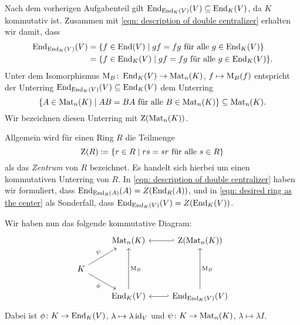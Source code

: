 \documentclass[a4paper, 10pt, numbers=noenddot]{scrartcl}
\begin{document}
Nach dem vorherigen Aufgabenteil gilt $\operatorname{End}_{\operatorname{End}_K(V)}(V) \subseteq \operatorname{End}_K(V)$, da $K$ kommutativ ist.
Zusammen mit \eqref{eqn: description of double centralizer} erhalten wir damit, dass
\begin{equation}
  \label{eqn: desired ring as the center}
  \begin{aligned}
        \operatorname{End}_{\operatorname{End}_K(V)}(V)
    &=  \{
          f \in \operatorname{End}(V)
        \mid
          \text{$gf = fg$ für alle $g \in \operatorname{End}_K(V)$}
        \}
    \\
    &=  \{
          f \in \operatorname{End}_K(V)
        \mid
          \text{$gf = fg$ für alle $g \in \operatorname{End}_K(V)$}
        \}.
  \end{aligned}
\end{equation}
Unter dem Isomorphismus $\operatorname{M}_B \colon \operatorname{End}_K(V) \to \operatorname{Mat}_n(K)$, $f \mapsto \operatorname{M}_B(f)$ entspricht der Unterring $\operatorname{End}_{\operatorname{End}_K(V)}(V) \subseteq \operatorname{End}_K(V)$ dem Unterring
\[
            \{
              A \in \operatorname{Mat}_n(K)
            \mid
              \text{$AB = BA$ für alle $B \in \operatorname{Mat}_n(K)$}
            \}
  \subseteq \operatorname{Mat}_n(K).
\]
Wir bezeichnen diesen Unterring mit $\operatorname{Z}(\operatorname{Mat}_n(K))$.

\begin{remark}
  Allgemein wird für einen Ring $R$ die Teilmenge
  \[
              \operatorname{Z}(R)
    \coloneqq \{ r \in R \mid \text{$rs = sr$ für alle $s \in R$} \}
  \]
  als das \emph{Zentrum} von $R$ bezeichnet.
  Es handelt sich hierbei um einen kommutativen Unterring von $R$.
  In \eqref{eqn: description of double centralizer} haben wir formuliert, dass $\operatorname{End}_{\operatorname{End}_R(A)}(A) = Z(\operatorname{End}_R(A))$, und in \eqref{eqn: desired ring as the center} als Sonderfall, dass $\operatorname{End}_{\operatorname{End}_K(V)}(V) = Z(\operatorname{End}_K(V))$.
\end{remark}

Wir haben nun das folgende kommutative Diagram:
\[
  \begin{tikzcd}
      {}
    & \Mat_n(K)
      \arrow[hookleftarrow]{r}
    & \Center(\Mat_n(K))
    \\
      K
      \arrow{ur}{\psi}
      \arrow[swap]{dr}{\phi}
    & {}
    & {}
    \\
      {}
    & \End_K(V)
      \arrow[swap]{uu}{\basismatrix_B}
      \arrow[hookleftarrow]{r}
    & \End_{\End_K(V)}(V)
      \arrow[swap]{uu}{\basismatrix_B}
  \end{tikzcd}
\]
Dabei ist $\phi \colon K \to \operatorname{End}_K(V)$, $\lambda \mapsto \lambda \operatorname{id}_V$ und $\psi \colon K \to \operatorname{Mat}_n(K)$, $\lambda \mapsto \lambda I$.
\end{document}
